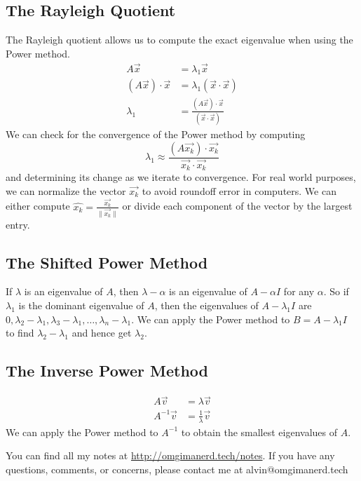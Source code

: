 \documentclass{math}
\begin{document}
\subsection*{The Rayleigh Quotient}
The Rayleigh quotient allows us to compute the exact eigenvalue when using the
Power method.
\begin{align*}
  A\vec{x} &= \lambda_1\vec{x} \\
  (A\vec{x})\cdot\vec{x} &= \lambda_1(\vec{x}\cdot\vec{x}) \\
  \lambda_1 &= \frac{(A\vec{x})\cdot\vec{x}}{(\vec{x}\cdot\vec{x})}
\end{align*}
We can check for the convergence of the Power method by computing
\[ \lambda_1 \approx
  \frac{(A\vec{x_k})\cdot\vec{x_k}}{\vec{x_k}\cdot\vec{x_k}} \]
and determining its change as we iterate to convergence. For real world
purposes, we can normalize the vector \( \vec{x_k} \) to avoid roundoff error
in computers. We can either compute \( \hat{x_k} =
\frac{\vec{x_k}}{\|\vec{x_k}\|} \) or divide each component of the vector by
the largest entry.

\subsection*{The Shifted Power Method}
If \( \lambda \) is an eigenvalue of \( A \), then \( \lambda-\alpha \) is an
eigenvalue of \( A-\alpha I \) for any \( \alpha \). So if \( \lambda_1 \) is
the dominant eigenvalue of \( A \), then the eigenvalues of \( A-\lambda_1I \)
are \( 0,\lambda_2-\lambda_1,\lambda_3-\lambda_1,\dots,\lambda_n-\lambda_1 \).
We can apply the Power method to \( B = A-\lambda_1I \) to find
\( \lambda_2-\lambda_1 \) and hence get \( \lambda_2 \).

\subsection*{The Inverse Power Method}
\begin{align*}
  A\vec{v} &= \lambda\vec{v} \\
  A^{-1}\vec{v} &= \frac{1}{\lambda}\vec{v}
\end{align*}
We can apply the Power method to \( A^{-1} \) to obtain the smallest eigenvalues
of \( A \).

\begin{center}
  You can find all my notes at \url{http://omgimanerd.tech/notes}. If you have
  any questions, comments, or concerns, please contact me at
  alvin@omgimanerd.tech
\end{center}
\end{document}
